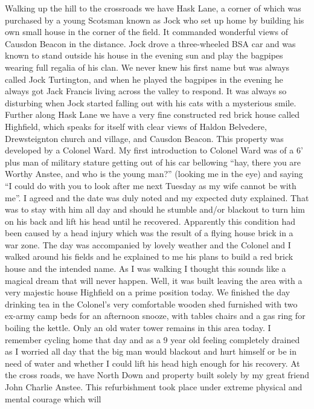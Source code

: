 
Walking up the hill to the crossroads we have Hask Lane, a corner of which was
purchased by a young Scotsman known as Jock who set up home by building his own
small house in the corner of the field. It commanded wonderful views of Causdon
Beacon in the distance. Jock drove a three-wheeled BSA car and was known to
stand outside his house in the evening sun and play the bagpipes wearing full
regalia of his clan. We never knew his first name but was always called Jock
Turtington, and when he played the bagpipes in the evening he always got Jack
Francis living across the valley to respond. It was always so disturbing when
Jock started falling out with his cats with a mysterious smile. Further along
Hask Lane we have a very fine constructed red brick house called Highfield,
which speaks for itself with clear views of Haldon Belvedere, Drewsteignton
church and village, and Causdon Beacon. This property was developed by a
Colonel Ward. My first introduction to Colonel Ward was of a 6' plus man of
military stature getting out of his car bellowing ``hay, there you are Worthy
Anstee, and who is the young man?'' (looking me in the eye) and saying ``I
could do with you to look after me next Tuesday as my wife cannot be with
me''. \here I agreed and the date was duly noted and my expected duty
explained. That was to stay with him all day and should he stumble and/or
blackout to turn him on his back and lift his head until he recovered.
Apparently this condition had been caused by a head injury which was the result
of a flying house brick in a war zone. The day was accompanied by lovely
weather and the Colonel and I walked around his fields and he explained to me
his plans to build a red brick house and the intended name. As I was walking I
thought this sounds like a magical dream that will never happen. Well, it was
built leaving the area with a very majestic house Highfield on a prime position
today. We finished the day drinking tea in the Colonel's very comfortable
wooden shed furnished with two ex-army camp beds for an afternoon snooze, with
tables chairs and a gas ring for boiling the kettle. Only an old water tower
remains in this area today. I remember cycling home that day and as a 9 year
old feeling completely drained as I worried all day that the big man would
blackout and hurt himself or be in need of water and whether I could lift his
head high enough for his recovery. At the cross roads, we have North Down and
property built solely by my great friend John Charlie Anstee. This
refurbishment took place under extreme physical and mental courage which will
